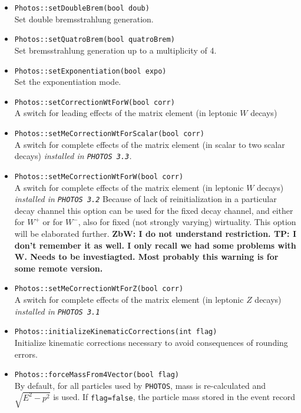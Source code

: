 \documentclass[]{Photos_interface_design}
\begin{document}
\begin{itemize}
  \item {\tt Photos::setDoubleBrem(bool doub)} \\
        Set double bremsstrahlung generation.
  \item {\tt Photos::setQuatroBrem(bool quatroBrem)} \\
        Set bremsstrahlung generation up to a multiplicity of 4.
  \item {\tt Photos::setExponentiation(bool expo)} \\
        Set the exponentiation mode.
  \item {\tt Photos::setCorrectionWtForW(bool corr)} \\
         A switch for leading effects of the matrix element (in leptonic $W$ decays)
  \item {\tt Photos::setMeCorrectionWtForScalar(bool corr)} \\
         A switch for complete effects of the matrix element (in scalar to two scalar decays) {\it  installed in {\tt PHOTOS 3.3}.}
  \item {\tt Photos::setMeCorrectionWtForW(bool corr)} \\
         A switch for complete effects of the matrix element (in leptonic $W$ decays) {\it  installed in {\tt PHOTOS 3.2} }
        Because of lack of reinitialization in a particular decay channel this option can be used for the fixed 
        decay channel, and either for  $W^+$ or for $W^-$, also for fixed (not strongly varying) wirtuality. 
        This option will be elaborated further. {\bf ZbW: I do not understand restriction. TP: I don't remember it as well. I only recall we had some problems with W. Needs to be investiagted. Most probably this warning is for some remote version.}
  \item {\tt Photos::setMeCorrectionWtForZ(bool corr)} \\
         A switch for complete effects of the matrix element (in leptonic $Z$ decays) {\it  installed in {\tt PHOTOS 3.1} }
  \item {\tt Photos::initializeKinematicCorrections(int flag)} \\
        Initialize kinematic corrections necessary to avoid consequences of rounding errors.
  \item {\tt Photos::forceMassFrom4Vector(bool flag)}  \\
        By default, for all particles used by {\tt PHOTOS}, 
        mass is re-calculated and $\sqrt{E^2-p^2}$ is used. 
        If {\tt flag=false}, the particle mass stored in the  event record 

\end{itemize}
\end{document}
